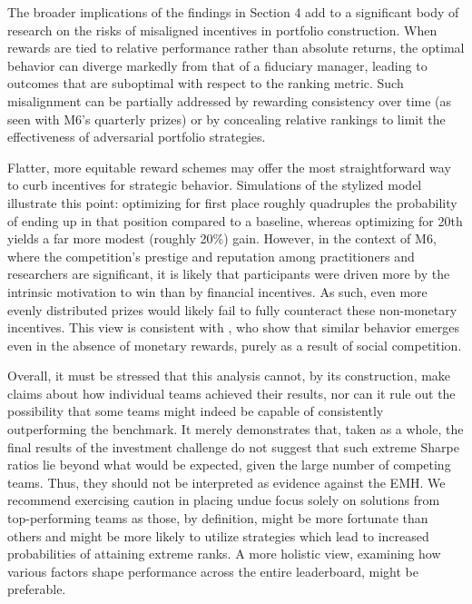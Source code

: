 \documentclass[3p,times,twocolumn]{elsarticle}
\begin{document}
The broader implications of the findings in Section 4 add to a significant body of research on the risks of misaligned incentives in portfolio construction. 
When rewards are tied to relative performance rather than absolute returns, the optimal behavior can diverge markedly from that of a fiduciary manager, leading to outcomes that are suboptimal with respect to the ranking metric. 
Such misalignment can be partially addressed by rewarding consistency over time (as seen with M6’s quarterly prizes) or by concealing relative rankings to limit the effectiveness of adversarial portfolio strategies.

Flatter, more equitable reward schemes may offer the most straightforward way to curb incentives for strategic behavior.
Simulations of the stylized model illustrate this point: optimizing for first place roughly quadruples the probability of ending up in that position compared to a baseline, whereas optimizing for 20th yields a far more modest (roughly 20\%) gain.
However, in the context of M6, where the competition’s prestige and reputation among practitioners and researchers are significant, it is likely that participants were driven more by the intrinsic motivation to win than by financial incentives. 
As such, even more evenly distributed prizes would likely fail to fully counteract these non-monetary incentives.
This view is consistent with \citet{dijkRankMattersImpact2014}, who show that similar behavior emerges even in the absence of monetary rewards, purely as a result of social competition.

Overall, it must be stressed that this analysis cannot, by its construction, make claims about how individual teams achieved their results, nor can it rule out the possibility that some teams might indeed be capable of consistently outperforming the benchmark.
It merely demonstrates that, taken as a whole, the final results of the investment challenge do not suggest that such extreme Sharpe ratios lie beyond what would be expected, given the large number of competing teams.
Thus, they should not be interpreted as evidence against the EMH.
We recommend exercising caution in placing undue focus solely on solutions from top-performing teams as those, by definition, might be more fortunate than others and might be more likely to utilize strategies which lead to increased probabilities of attaining extreme ranks.
A more holistic view, examining how various factors shape performance across the entire leaderboard, might be preferable.


% 
\end{document}
